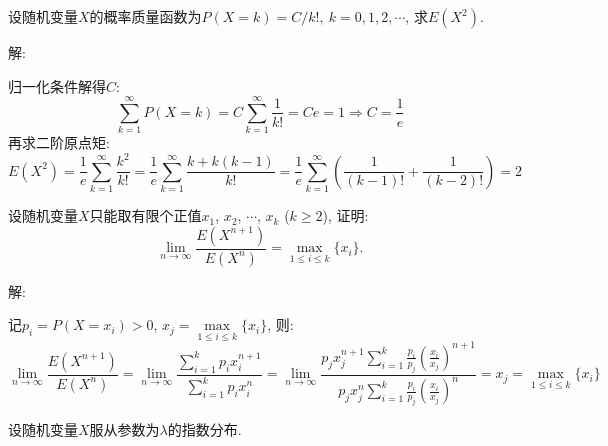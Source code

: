 \documentclass[standard]{ExBook}
\begin{document}
\begin{qitems}
\vspace{-5em}

    \begin{bbox}
    \begin{shaded}
        \qitem
设随机变量$X$的概率质量函数为$P(X=k)=C/k!,\ k=0,1,2,\cdots$, 求$E(X^2)$.
    \end{shaded}
    \end{bbox}

\vspace{-5em}

    \begin{bbox}
解: 

归一化条件解得$C$:
$$\sum\limits_{k=1}^{\infty}P(X=k)=C\sum\limits_{k=1}^{\infty}\frac{1}{k!}=Ce=1 \Longrightarrow C=\frac{1}{e}$$
再求二阶原点矩:
$$E(X^2)=\frac{1}{e}\sum\limits_{k=1}^{\infty}\frac{k^2}{k!}=\frac{1}{e}\sum\limits_{k=1}^{\infty}\frac{k+k(k-1)}{k!}=\frac{1}{e}\sum\limits_{k=1}^{\infty}\left(\frac{1}{(k-1)!}+\frac{1}{(k-2)!}\right)=2$$
    \end{bbox}

\vspace{-5em}

    \begin{bbox}
    \begin{shaded}
        \qitem
设随机变量$X$只能取有限个正值$x_1$, $x_2$, $\cdots$, $x_k$ ($k\geq 2$), 证明:
$$\lim\limits_{n\to\infty}\displaystyle\frac{E(X^{n+1})}{E(X^{n})}=\max\limits_{1\leq i\leq k}\{x_i\}.$$
    \end{shaded}
    \end{bbox}

\vspace{-5em}

    \begin{bbox}
解: 

记$p_i=P(X=x_i)>0$, $x_j=\max\limits_{1\leq i\leq k}\{x_i\}$, 则:
$$\lim\limits_{n\to\infty}\displaystyle\frac{E(X^{n+1})}{E(X^{n})}=\lim\limits_{n\to\infty}\frac{\sum\limits_{i=1}^{k}p_{i}x_{i}^{n+1}}{\sum\limits_{i=1}^{k}p_{i}x_{i}^{n}}=\lim\limits_{n\to\infty}\frac{p_{j} x_{j}^{n+1}\sum\limits_{i=1}^{k}\frac{p_i}{p_j}\left(\frac{x_i}{x_j}\right)^{n+1}}{p_{j} x_{j}^{n}\sum\limits_{i=1}^{k}\frac{p_i}{p_j}\left(\frac{x_i}{x_j}\right)^{n}}=x_j=\max\limits_{1\leq i\leq k}\{x_i\}$$
    \end{bbox}

\vspace{-5em}

    \begin{bbox}
    \begin{shaded}
        \qitem
设随机变量$X$服从参数为$\lambda$的指数分布.


\end{shaded}
\end{bbox}
\end{qitems}
\end{document}
